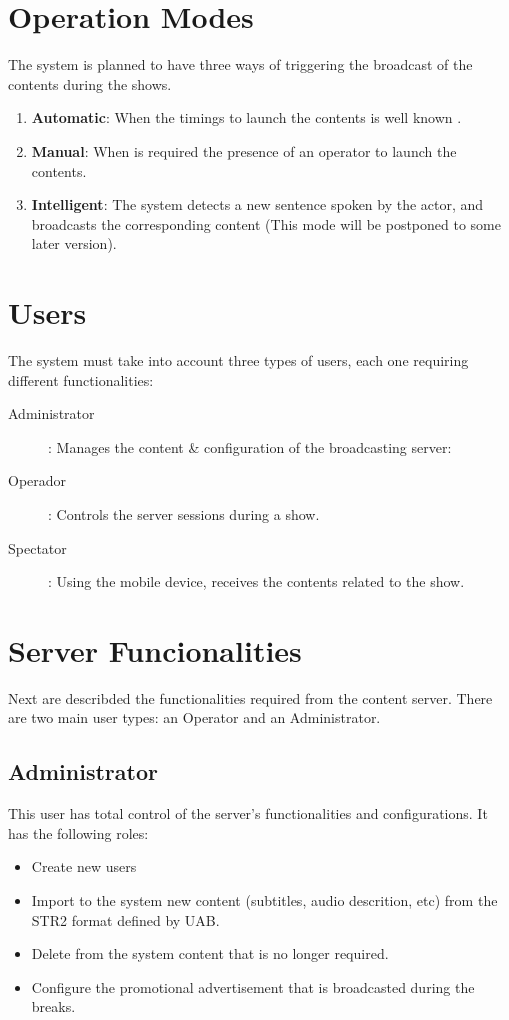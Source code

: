 \documentclass[10pt, oneside, a4paper]{article}
\begin{document}
\section{Operation Modes}
The system is planned to have three ways of triggering the broadcast of the contents during the shows.

\begin{enumerate}
	\item \textbf{Automatic}: When the timings to launch the contents is well known .
	\item \textbf{Manual}: When is required the presence of an operator to launch the contents.
	\item \textbf{Intelligent}: The system detects a new sentence spoken by the actor, and broadcasts the corresponding content (This mode will be postponed to some later version).
\end{enumerate}



\section{Users}
The system must take into account three types of users, each one requiring different functionalities:
 
\begin{description}
	\item[Administrator]: Manages the content \& configuration of the broadcasting server:
	\item[Operador]: Controls the server sessions during a show.
	\item[Spectator]: Using the mobile device, receives the contents related to the show.		
\end{description}


\section{Server Funcionalities}
Next are describded the functionalities required from the content server. There are two main user types: an Operator and an Administrator. 

\subsection{Administrator}
This user has total control of the server's functionalities and configurations. It has the following roles:
\begin{itemize}
	\item Create new users
	\item Import to the system new content (subtitles, audio descrition, etc) from the STR2 format defined by UAB.
	\item Delete from the system content that is no longer required.
	\item Configure the promotional advertisement that is broadcasted during the breaks.
\end{itemize}
\end{document}
